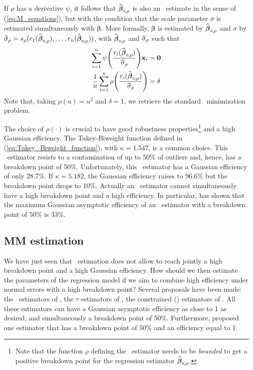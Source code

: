 If $\rho$ has a derivative $\psi$, it follows that
$\sthat{\boldsymbol{\beta}}_{\stsc{S};\rho}$ is also an ~estimate in
the sense of (\ref{eq:M_equations}), but with the condition that the scale
parameter $\sigma$ is estimated simultaneously with $\boldsymbol\beta$. More
formally, $\boldsymbol\beta$ is estimated by
$\sthat{\boldsymbol\beta}_{\stsc{S};\rho}$ and $\sigma$ by
$\sthat{\sigma}_{\rho}=s_{\rho}(r_1(\sthat{\boldsymbol\beta}_{\stsc{S};\rho}),
 \dots, r_n(\sthat{\boldsymbol\beta}_{\stsc{S};\rho}))$, with
$\sthat{\boldsymbol\beta}_{\stsc{S};\rho}$ and $\widehat{\sigma}_{\rho}$ such that
\[
    \begin{aligned}
        \sum_{i=1}^{n} 
        \psi\left(\frac{r_i(\sthat{\boldsymbol\beta}_{\stsc{S};\rho})}{\sthat{\sigma}_{\rho}}\right) \stvec{x}_i 
        & = \stvec{0}
        \\
        \frac{1}{n} \sum_{i=1}^{n}
        \rho\left(\frac{r_i(\sthat{\boldsymbol\beta}_{\stsc{S};\rho})}{\sthat{\sigma}_{\rho}}\right)
        & = \delta
    \end{aligned}
\]
Note that, taking $\rho(u) = u^2$ and $\delta=1$, we retrieve
the standard ~minimization problem.

The choice of $\rho(\cdot)$ is crucial to have good robustness
properties\footnote{Note that the function $\rho$ defining the 
~estimator needs to be \emph{bounded} to get a positive breakdown point for the
regression estimator $\sthat{\boldsymbol\beta}_{\stsc{S};\rho}$.} and a high
Gaussian efficiency. The Tukey-Biweight function defined in
(\ref{eq:Tukey_Biweight_function}), with $\kappa = 1.547$, is a common choice.
This ~estimator resists to a contamination of up to 50\% of outliers
and, hence, has a breakdown point of 50\%. Unfortunately, this 
~estimator has a Gaussian efficiency of only 28.7\%. If $\kappa = 5.182$, the
Gaussian efficiency raises to 96.6\% but the breakdown point drops to 10\%.
Actually an ~estimator cannot simultaneously have a high breakdown
point and a high efficiency. In particular, \citet{Hossjer:1992} has shown that the
maximum Gaussian asymptotic efficiency of an ~estimator with a
breakdown point of 50\% is 33\%.

\subsection{MM estimation}
\label{subsec:MM_estimation}

We have just seen that ~estimation does not allow to reach jointly a
high breakdown point and a high Gaussian efficiency. How should we then
estimate the parameters of the regression model if we aim to combine high
efficiency under normal errors with a high breakdown point? Several proposals
have been made: the ~estimators of \citet{yohai:1987}, the $\tau$
estimators of \citet{Yohai:1988}, the constrained  ()
estimators of \citet{Mendes:1996}. All these estimators can have a Gaussian
asymptotic efficiency as close to 1 as desired, and simultaneously a breakdown
point of 50\%. Furthermore, \citet{Gervini:2002} proposed one estimator that
has a breakdown point of 50\% and an efficiency equal to 1.

